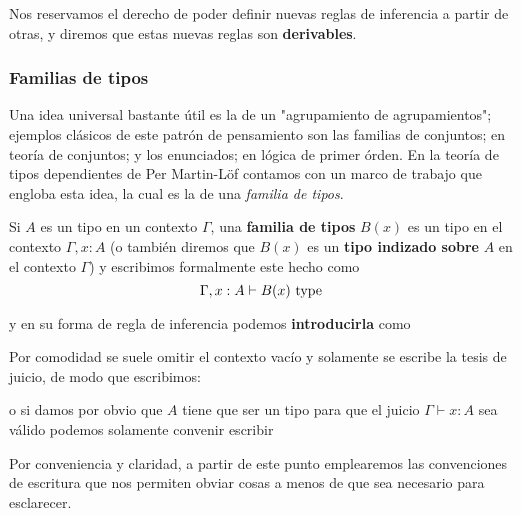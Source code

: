 \documentclass{article}
\begin{document}
        Nos reservamos el derecho de poder definir nuevas reglas de inferencia a partir de otras, y diremos que estas nuevas reglas son \textbf{derivables}.
    
    \subsubsection{Familias de tipos}
        Una idea universal bastante útil es la de un "agrupamiento de agrupamientos"; ejemplos clásicos de este patrón de pensamiento son
        las familias de conjuntos; en teoría de conjuntos; y los enunciados; en lógica de primer órden. En la teoría de tipos dependientes
        de Per Martin-Löf contamos con un marco de trabajo que engloba esta idea, la cual es la de una \textit{familia de tipos}.

        \begin{definition}\label{def:familia_tipos}
            Si $A$ es un tipo en un contexto $\Gamma$, una \textbf{familia de tipos} $B(x)$ es un tipo en el contexto $\Gamma, x : A$ (o también diremos
            que $B(x)$ es un \textbf{tipo indizado sobre} $A$ en el contexto $\Gamma$) y
            escribimos formalmente este hecho como
            $$
                \Gamma, x : A \vdash B(x)\ \type
            $$

            y en su forma de regla de inferencia podemos \textbf{introducirla} como
            \begin{prooftree}
            \end{prooftree}

            Por comodidad se suele omitir el contexto vacío y solamente se escribe la tesis de juicio, de modo que escribimos:

            \begin{prooftree}
            \end{prooftree}

            o si damos por obvio que $A$ tiene que ser un tipo para que el juicio $\Gamma \vdash x : A$ sea válido podemos solamente convenir escribir
            \begin{prooftree}
            \end{prooftree}
        
            Por conveniencia y claridad, a partir de este punto emplearemos las convenciones de escritura que nos permiten obviar cosas a menos de que sea
            necesario para esclarecer.
        \end{definition}
\end{document}
